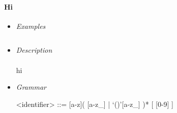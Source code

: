 \documentclass{article}
\begin{document}
\paragraph{Hi}

\begin{itemize}

\item \textit{Examples}
\begin{verbatim}
\end{verbatim}

\item \textit{Description} \\\\
hi

\item \textit{Grammar}
\begin{grammar}
<identifier> ::= [a-z]( [a-z_] | `()'[a-z_] )* [ [0-9] ]
\end{grammar}

\end{itemize}
\end{document}
